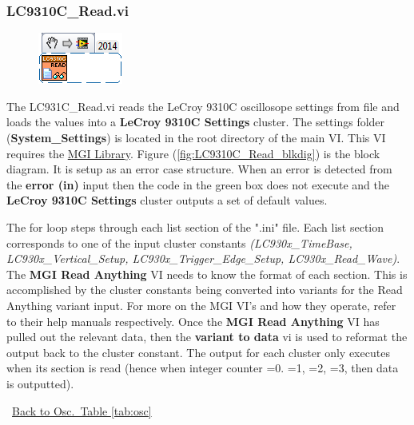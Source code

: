 \documentclass[11pt,a4paper,oldfontcommands]{memoir}
\begin{document}
\subsubsection{LC9310C\_Read.vi} \label{LC9310C_Read}
\noindent\hrulefill

\begin{figure}[h]
	\includegraphics[scale=0.625]{LC931C_Read_main}
	\label{fig:LC9310C_Read_main}
\end{figure}

The LC931C\_Read.vi reads the LeCroy 9310C oscillosope settings from file and loads the values into a \textbf{LeCroy 9310C Settings} cluster. The settings folder (\textbf{System\_Settings}) is located in the root directory of the main VI. This VI requires the \href{http://sine.ni.com/nips/cds/view/p/lang/en/nid/209753}{MGI Library}. Figure (\ref{fig:LC9310C_Read_blkdig}) is the block diagram.  It is setup as an error case structure. When an error is detected from the \textbf{error (in)} input then the code in the green box does not execute and the \textbf{LeCroy 9310C Settings} cluster outputs a set of default values.

The for loop steps through each list section of the ".ini" file. Each list section corresponds to one of the input cluster constants \textit{(LC930x\_TimeBase, LC930x\_Vertical\_Setup, LC930x\_Trigger\_Edge\_Setup, LC930x\_Read\_Wave)}. The \textbf{MGI Read Anything} VI needs to know the format of each section. This is accomplished by the cluster constants being converted into variants for the Read Anything variant input.  For more on the MGI VI's and how they operate, refer to their help manuals respectively. Once the \textbf{MGI Read Anything} VI has pulled out the relevant data, then the \textbf{variant to data} vi is used to reformat the output back to the cluster constant. The output for each cluster only executes when its section is read (hence when integer counter =0. =1, =2, =3, then data is outputted). 

\noindent\hrulefill\, \hyperref[tab:osc]{Back to Osc.\ Table \ref{tab:osc}}
\end{document}
